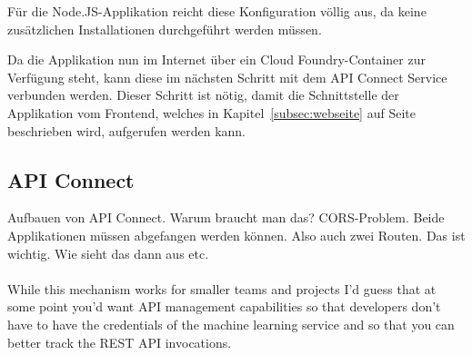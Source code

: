 Für die Node.JS-Applikation reicht diese Konfiguration völlig aus, da keine zusätzlichen Installationen durchgeführt
werden müssen.

Da die Applikation nun im Internet über ein Cloud Foundry-Container zur Verfügung steht, kann diese im nächsten Schritt
mit dem API Connect Service verbunden werden. Dieser Schritt ist nötig, damit die Schnittstelle der Applikation vom
Frontend, welches in Kapitel~\ref{subsec:webseite} auf Seite~\pageref{subsec:webseite} beschrieben wird, aufgerufen werden
kann.

\subsection{API Connect}
Aufbauen von API Connect. Warum braucht man das? CORS-Problem. Beide Applikationen müssen abgefangen werden können. Also
auch zwei Routen. Das ist wichtig. Wie sieht das dann aus etc.
\\ \\
While this mechanism works for smaller teams and projects I’d guess that at some point you’d want API management
capabilities so that developers don’t have to have the credentials of the machine learning service and so that you can
better track the REST API invocations.